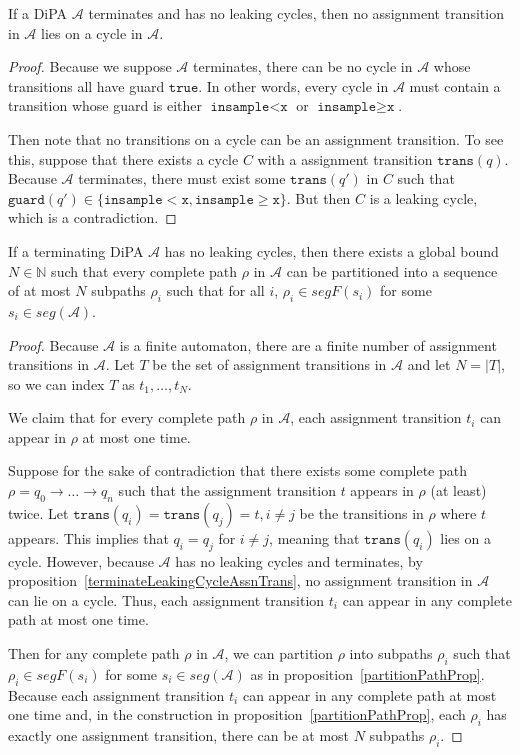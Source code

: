 \documentclass[12pt]{article}
\newcommand{\NN}{\mathbb{N}}
\newcommand{\gguard}[1][x]{\texttt{insample}\geq \texttt{#1}}
\newcommand{\lguard}[1][x]{\texttt{insample} < \texttt{#1}}
\newcommand{\guard}{\texttt{guard}}
\newcommand{\trans}{\texttt{trans}}
\theoremstyle{definition}
\begin{document}
\begin{prop}\label{terminateLeakingCycleAssnTrans}
	If a DiPA $\mathcal{A}$ terminates and has no leaking cycles, then no assignment transition in $\mathcal{A}$ lies on a cycle in $\mathcal{A}$. 
\end{prop}
\begin{proof}
	Because we suppose $\mathcal{A}$ terminates, there can be no cycle in $\mathcal{A}$ whose transitions all have guard $\texttt{true}$. In other words, every cycle in $\mathcal{A}$ must contain a transition whose guard is either $\lguard$ or $\gguard$. 
	
	Then note that no transitions on a cycle can be an assignment transition. To see this, suppose that there exists a cycle $C$ with a assignment transition $\trans(q)$. Because $\mathcal{A}$ terminates, there must exist some $\trans(q')$ in $C$ such that $\guard(q') \in \{\lguard, \gguard\}$. But then $C$ is a leaking cycle, which is a contradiction. 
\end{proof}


\begin{lemma}\label{wellformedFinitesegmentsLemma}
	If a terminating DiPA $\mathcal{A}$ has no leaking cycles, then there exists a global bound $N\in \NN$ such that every complete path $\rho$ in $\mathcal{A}$ can be partitioned into a sequence of at most $N$ subpaths $\rho_i$ such that for all $i$, $\rho_i \in segF(s_i)$ for some $s_i\in seg(\mathcal{A})$.
\end{lemma}

\begin{proof}
	Because $\mathcal{A}$ is a finite automaton, there are a finite number of assignment transitions in $\mathcal{A}$. Let $T$ be the set of assignment transitions in $\mathcal{A}$ and let $N = |T|$, so we can index $T$ as $t_1, \ldots, t_N$.
	
	We claim that for every complete path $\rho$ in $\mathcal{A}$, each assignment transition $t_i$ can appear in $\rho$ at most one time. 

	Suppose for the sake of contradiction that there exists some complete path $\rho = q_0\to\ldots\to q_n$ such that the assignment transition $t$ appears in $\rho$ (at least) twice. 
	Let $\trans(q_i)=\trans(q_j)=t, i\neq j$ be the transitions in $\rho$ where $t$ appears. This  implies that $q_i = q_j$ for $i\neq j$, meaning that $\trans(q_i)$ lies on a cycle. However, because $\mathcal{A}$ has no leaking cycles and terminates, by proposition~\ref{terminateLeakingCycleAssnTrans}, no assignment transition in $\mathcal{A}$ can lie on a cycle. Thus, each assignment transition $t_i$ can appear in any complete path at most one time. 

	Then for any complete path $\rho$ in $\mathcal{A}$, we can partition $\rho$ into subpaths $\rho_i$ such that $\rho_i \in segF(s_i)$ for some $s_i\in seg(\mathcal{A})$ as in proposition~\ref{partitionPathProp}. Because each assignment transition $t_i$ can appear in any complete path at most one time and, in the construction in proposition~\ref{partitionPathProp}, each $\rho_i$ has exactly one assignment transition, there can be at most $N$ subpaths $\rho_i$. 
\end{proof}
\end{document}
